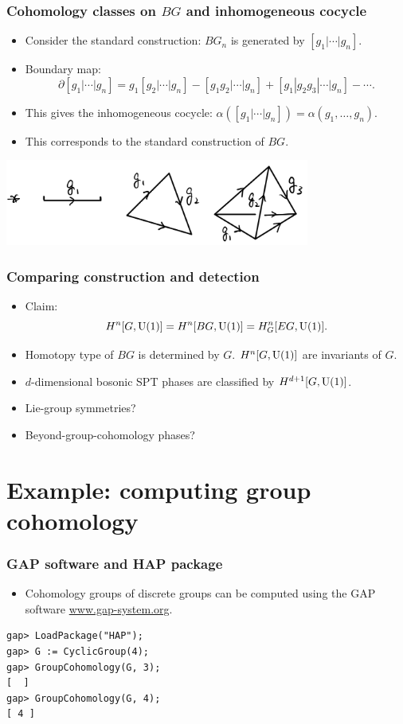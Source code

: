 \documentclass[xcolor=table, aspectratio=43,ignorenonframetext]{beamer}
\newcommand{\uone}{\text U(1)}
\begin{document}
\begin{frame}
	\frametitle{Cohomology classes on $BG$ and inhomogeneous cocycle}
	\begin{itemize}
		\item Consider the standard construction:
		$BG_n$ is generated by $[g_1|\cdots|g_n]$.
		\item Boundary map:
		\[\partial[g_1|\cdots|g_n]=g_1[g_2|\cdots|g_n]
		-[g_1g_2|\cdots|g_n]+[g_1|g_2g_3|\cdots|g_n]-\cdots.\]
		\item This gives the inhomogeneous cocycle:
		$\alpha([g_1|\cdots|g_n])=\alpha(g_1,\ldots,g_n)$.
		\item This corresponds to the standard construction of $BG$.
	\end{itemize}
\begin{center}
	\includegraphics[width=10cm]{../chainmap/bg-std}
\end{center}
\end{frame}

\begin{frame}
	\frametitle{Comparing construction and detection}
	\begin{itemize}
		\item Claim:
		\[H^n[G, \uone] = H^n[BG, \uone] = H^n_G[EG, \uone].\]
		\item Homotopy type of $BG$ is determined by $G$. $H^n[G, \uone]$ are invariants of $G$.
		\item $d$-dimensional bosonic SPT phases are classified by
		$H^{d+1}[G, \uone]$.
		\item Lie-group symmetries?
		\item Beyond-group-cohomology phases?
	\end{itemize}
\end{frame}

\section{Example: computing group cohomology}

\begin{frame}[fragile]
	\frametitle{GAP software and HAP package}
	\begin{itemize}
		\item Cohomology groups of discrete groups can be computed using the GAP software \url{www.gap-system.org}.
	\end{itemize}
	\begin{verbatim}
gap> LoadPackage("HAP");
gap> G := CyclicGroup(4);
gap> GroupCohomology(G, 3);
[  ]
gap> GroupCohomology(G, 4);
[ 4 ]
	\end{verbatim}
\end{frame}
\end{document}
